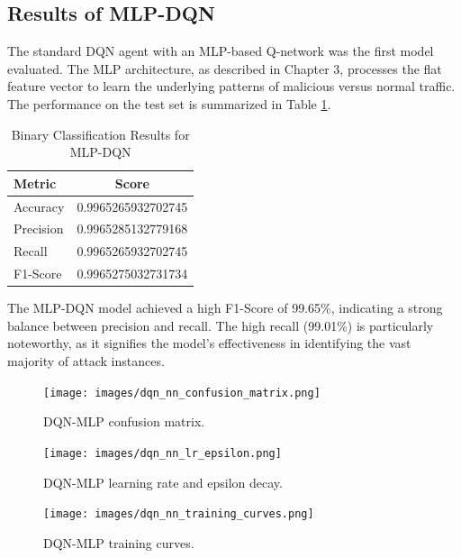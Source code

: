 \documentclass[12pt]{report}
\begin{document}
\subsection{Results of MLP-DQN}
The standard DQN agent with an MLP-based Q-network was the first model evaluated. The MLP architecture, as described in Chapter 3, processes the flat feature vector to learn the underlying patterns of malicious versus normal traffic. The performance on the test set is summarized in Table \ref{tab:binary_dqn_results}.

\begin{table}[H]
    \centering
    \caption{Binary Classification Results for MLP-DQN}
    \label{tab:binary_dqn_results}
    \begin{tabular}{@{}lc@{}}
        \toprule
        \textbf{Metric} & \textbf{Score} \\
        \midrule
        Accuracy & 0.9965265932702745 \\
        Precision & 0.9965285132779168 \\
        Recall & 0.9965265932702745 \\
        F1-Score & 0.9965275032731734 \\
        \bottomrule
    \end{tabular}
\end{table}

The MLP-DQN model achieved a high F1-Score of 99.65\%, indicating a strong balance between precision and recall. The high recall (99.01\%) is particularly noteworthy, as it signifies the model's effectiveness in identifying the vast majority of attack instances.
\begin{figure}[htbp]
    \centering
    \texttt{[image: images/dqn\_nn\_confusion\_matrix.png]}
    \caption{DQN-MLP confusion matrix.}
    \label{fig:dqn_nn_confusion}
\end{figure}

\vspace{0.5cm}

\begin{figure}[htbp]
    \centering
    \texttt{[image: images/dqn\_nn\_lr\_epsilon.png]}
    \caption{DQN-MLP learning rate and epsilon decay.}
    \label{fig:dqn_nn_lr_epsilon}
\end{figure}

\vspace{0.5cm}

\begin{figure}[htbp]
    \centering
    \texttt{[image: images/dqn\_nn\_training\_curves.png]}
    \caption{DQN-MLP training curves.}
    \label{fig:dqn_nn_training_curves}
\end{figure}
\end{document}
